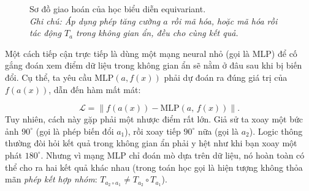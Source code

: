 \begin{figure}[H]
    \centering
    \caption[Sơ đồ giao hoán của học biểu diễn equivariant]{%
      Sơ đồ giao hoán của học biểu diễn equivariant.\\
      \textit{Ghi chú: Áp dụng phép tăng cường $a$ rồi mã hóa, hoặc mã hóa rồi tác động $T_a$ trong không gian ẩn, đều cho cùng kết quả.}%
    }
    \label{fig:equivariant-repr}
\end{figure}

Một cách tiếp cận trực tiếp là dùng một mạng neural nhỏ (gọi là MLP) để cố gắng đoán xem điểm dữ liệu trong không gian ẩn sẽ nằm ở đâu sau khi bị biến đổi. Cụ thể, ta yêu cầu $\mathrm{MLP}(a, f(x))$ phải dự đoán ra đúng giá trị của $f(a(x))$, dẫn đến hàm mất mát:

\begin{equation}
    \mathcal{L} = \bigl\| f(a(x)) - \mathrm{MLP}(a,\, f(x)) \bigr\|.
\end{equation}
Tuy nhiên, cách này gặp phải một nhược điểm rất lớn. Giả sử ta xoay một bức ảnh $90^\circ$ (gọi là phép biến đổi $a_1$), rồi xoay tiếp $90^\circ$ nữa (gọi là $a_2$). Logic thông thường đòi hỏi kết quả trong không gian ẩn phải y hệt như khi bạn xoay một phát $180^\circ$. Nhưng vì mạng MLP chỉ đoán mò dựa trên dữ liệu, nó hoàn toàn có thể cho ra hai kết quả khác nhau (trong toán học gọi là hiện tượng không thỏa mãn \textit{phép kết hợp nhóm}: $T_{a_2 \circ a_1} \neq T_{a_2} \circ T_{a_1}$).


